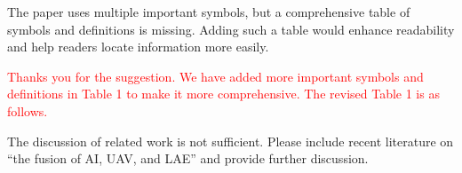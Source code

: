 \begin{revcomment}
	The paper uses multiple important symbols, but a comprehensive table of symbols and definitions is missing. Adding such a table would enhance readability and help readers locate information more easily.
\end{revcomment}
\begin{revresponse}
	\textcolor{red}{
	Thanks you for the suggestion. We have added more important symbols and definitions in Table 1 to make it more comprehensive. The revised Table 1 is as follows.
	}
	\begin{changes}
	\end{changes}
\end{revresponse}

\begin{revcomment}
	The discussion of related work is not sufficient. Please include recent literature on ``the fusion of AI, UAV, and LAE'' and provide further discussion.
\end{revcomment}
